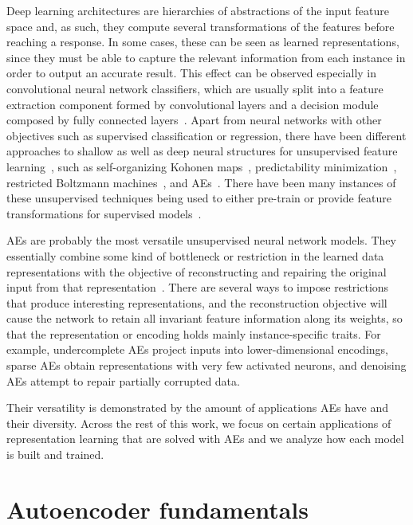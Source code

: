 Deep learning architectures are hierarchies of abstractions of the input feature space and, as such, they compute several transformations of the features before reaching a response. In some cases, these can be seen as learned representations, since they must be able to capture the relevant information from each instance in order to output an accurate result. This effect can be observed especially in convolutional neural network classifiers, which are usually split into a feature extraction component formed by convolutional layers and a decision module composed by fully connected layers~. Apart from neural networks with other objectives such as supervised classification or regression, there have been different approaches to shallow as well as deep neural structures for unsupervised feature learning~, such as self-organizing Kohonen maps~, predictability minimization~, restricted Boltzmann machines~, and AEs~. There have been many instances of these unsupervised techniques being used to either pre-train or provide feature transformations for supervised models~.

AEs are probably the most versatile unsupervised neural network models. They essentially combine some kind of bottleneck or restriction in the learned data representations with the objective of reconstructing and repairing the original input from that representation~. There are several ways to impose restrictions that produce interesting representations, and the reconstruction objective will cause the network to retain all invariant feature information along its weights, so that the representation or encoding holds mainly instance-specific traits. For example, undercomplete AEs project inputs into lower-dimensional encodings, sparse AEs obtain representations with very few activated neurons, and denoising AEs attempt to repair partially corrupted data.

Their versatility is demonstrated by the amount of applications AEs have and their diversity. Across the rest of this work, we focus on certain applications of representation learning that are solved with AEs and we analyze how each model is built and trained. 


\section{Autoencoder fundamentals}\label{sec:ae}

